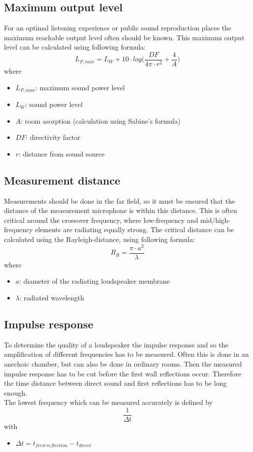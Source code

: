 \documentclass{article}
\begin{document}
\subsection{Maximum output level}
For an optimal listening experience or public sound reproduction places the maximum reachable output level often should be known. This maximum output level can be calculated using following formula:
\begin{equation}
L_{P,max}=L_W+10\cdot log\bigg(\frac{DF}{4\pi\cdot r^2}+\frac{4}{A}\bigg)
\end{equation}
where
\begin{itemize}
\item $L_{P,max}$: maximum sound power level
\item $L_W$: sound power level
\item $A$: room asorption (calculation using Sabine's formula)
\item $DF$: directivity factor
\item $r$: distance from sound source
\end{itemize}
\subsection{Measurement distance}
Measurements should be done in the far field, so it must be ensured that the distance of the measurement microphone is within this distance. This is often critical around the crossover frequency, where low-frequency and mid/high-frequency elements are radiating equally strong. The critical distance can be calculated using the Rayleigh-distance, using following formula:
\begin{equation}
R_R=\frac{\pi\cdot a^2}{\lambda}
\end{equation}
where
\begin{itemize}
\item $a$: diameter of the radiating loudspeaker membrane
\item $\lambda$: radiated wavelength 
\end{itemize}
\subsection{Impulse response}
To determine the quality of a loudspeaker the impulse response and so the amplification of different frequencies has to be measured. Often this is done in an anechoic chamber, but can also be done in ordinary rooms. Then the measured impulse response has to be cut before the first wall reflections occur. Therefore the time distance between direct sound and first reflections has to be long enough.\\
The lowest frequency which can be measured accurately is defined by
\begin{equation}
\frac{1}{\Delta t}
\end{equation}
with 
\begin{itemize}
\item $\Delta t = t_{first\,reflection}-t_{direct}$
\end{itemize}
\end{document}
